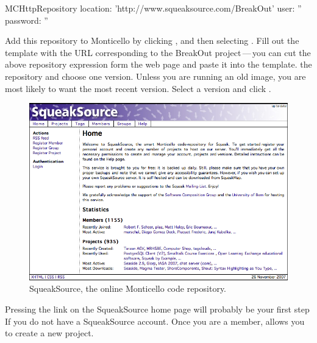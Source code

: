 \documentclass[a4paper,10pt,twoside]{book}
\begin{document}
\begin{code}{}
MCHttpRepository
    location: 'http://www.squeaksource.com/BreakOut'
    user: ''
    password: ''
\end{code}

Add this repository to Monticello by clicking , and then selecting . Fill out the template with the URL corresponding to the BreakOut project\,---\,you can cut the above repository expression form the web page and paste it into the template.
 the repository and choose one version. 
Unless you are running an old image, you are most likely to want the most recent version. Select a version and click .


\begin{figure}[ht]\centering
	\includegraphics[width=.75\linewidth]{squeaksource2}
	\caption{SqueakSource, the online Monticello code repository.}
\end{figure}

Pressing the  link on the SqueakSource home page will probably be your first step If you do not have a SqueakSource account. 
Once you are a member,  allows you to create a new project. 
\end{document}
